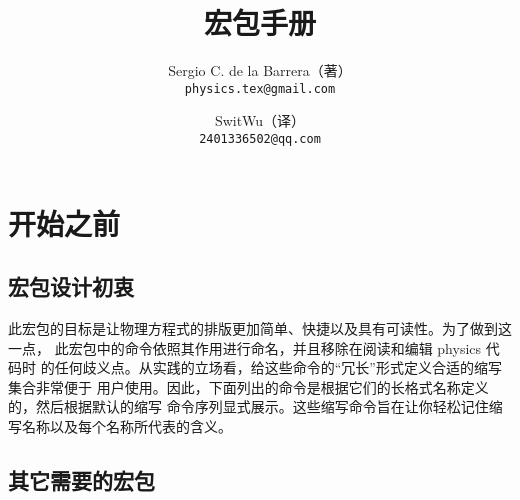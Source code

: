 \documentclass{article}
\title{\pkg{physics} 宏包手册}
\author{Sergio C. de la Barrera（著） \\ \texttt{physics.tex@gmail.com}
        \and SwitWu（译） \\ \texttt{2401336502@qq.com}}
\newcommand{\pkg}[1]{\textsf{#1}}
\begin{document}
\maketitle

\tableofcontents

\section{开始之前}

\subsection{宏包设计初衷}

此宏包的目标是让物理方程式的排版更加简单、快捷以及具有可读性。为了做到这一点，
此宏包中的命令依照其作用进行命名，并且移除在阅读和编辑 \pkg{physics} 代码时
的任何歧义点。从实践的立场看，给这些命令的“冗长”形式定义合适的缩写集合非常便于
用户使用。因此，下面列出的命令是根据它们的长格式名称定义的，然后根据默认的缩写
命令序列显式展示。这些缩写命令旨在让你轻松记住缩写名称以及每个名称所代表的含义。

\subsection{其它需要的宏包}
\end{document}
